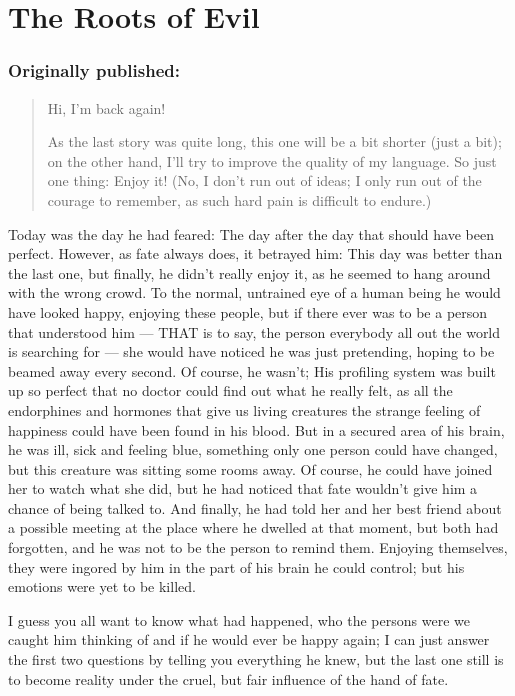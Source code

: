\chapter{The Roots of Evil}
\label{cha:roots-evil}
\subsection*{Originally published: }
\begin{quote}
Hi, I'm back again!

As the last story was quite long, this one will be a bit shorter (just a bit); on the other hand, I'll try to improve the quality of my language. So just one thing: Enjoy it!
(No, I don't run out of ideas; I only run out of the courage to remember, as such hard pain is difficult to endure.)
\end{quote}

Today was the day he had feared: The day after the day that should have been perfect. However, as fate always does, it betrayed him: This day was better than the last one, but finally, he didn't really enjoy it, as he seemed to hang around with the wrong crowd. To the normal, untrained eye of a human being he would have looked happy, enjoying these people, but if there ever was to be a person that understood him --- THAT is to say, the person everybody all out the world is searching for --- she would have noticed he was just pretending, hoping to be beamed away every second. Of course, he wasn't; His profiling system was built up so perfect that no doctor could find out what he really felt, as all the endorphines and hormones that give us living creatures the strange feeling of happiness could have been found in his blood. But in a secured area of his brain, he was ill, sick and feeling blue, something only one person could have changed, but this creature was sitting some rooms away. Of course, he could have joined her to watch what she did, but he had noticed that fate wouldn't give him a chance of being talked to. And finally, he had told her and her best friend about a possible meeting at the place where he dwelled at that moment, but both had forgotten, and he was not to be the person to remind them. Enjoying themselves, they were ingored by him in the part of his brain he could control; but his emotions were yet to be killed.

I guess you all want to know what had happened, who the persons were we caught him thinking of and if he would ever be happy again; I can just answer the first two questions by telling you everything he knew, but the last one still is to become reality under the cruel, but fair influence of the hand of fate.

